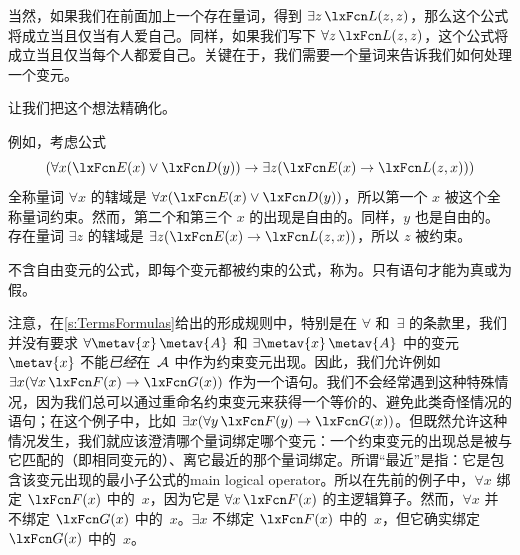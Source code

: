 当然，如果我们在前面加上一个存在量词，得到 $\exists z\,\atom{L}{z,z}$，那么这个公式将成立当且仅当有人爱自己。同样，如果我们写下 $\forall z\, \atom{L}{z,z}$，这个公式将成立当且仅当每个人都爱自己。关键在于，我们需要一个量词来告诉我们如何处理一个变元。

让我们把这个想法精确化。



例如，考虑公式
	$$(\forall x(\atom{E}{x} \eor \atom{D}{y}) \eif \exists z(\atom{E}{x} \eif \atom{L}{z,x}))$$
全称量词 $\forall x$ 的辖域是 $\forall x (\atom{E}{x} \eor \atom{D}{y})$，所以第一个 $x$ 被这个全称量词约束。然而，第二个和第三个 $x$ 的出现是自由的。同样，$y$ 也是自由的。存在量词 $\exists z$ 的辖域是 $\exists z(\atom{E}{x} \eif \atom{L}{z,x})$，所以 $z$ 被约束。

不含自由变元的公式，即每个变元都被约束的公式，称为。只有语句才能为真或为假。


注意，在\cref{s:TermsFormulas}给出的形成规则中，特别是在 $\forall$ 和~$\exists$ 的条款里，我们并没有要求 $\forall\metav{x}\,
\metav{A}$ 和 $\exists\metav{x}\,\metav{A}$ 中的变元~$\metav{x}$ 不能\emph{已经}在~$\mathcal{A}$ 中作为约束变元出现。因此，我们允许例如 $\exists x(\forall x\,\atom{F}{x} \eif \atom{G}{x})$ 作为一个语句。我们不会经常遇到这种特殊情况，因为我们总可以通过重命名约束变元来获得一个等价的、避免此类奇怪情况的语句；在这个例子中，比如 $\exists x(\forall y\,\atom{F}{y} \eif
\atom{G}{x})$。但既然允许这种情况发生，我们就应该澄清哪个量词绑定哪个变元：一个约束变元的出现总是被与它匹配的（即相同变元的）、离它最近的那个量词绑定。所谓“最近”是指：它是包含该变元出现的最小子公式的\gls{main logical operator}。所以在先前的例子中，$\forall x$ 绑定 $\atom{F}{x}$ 中的~$x$，因为它是 $\forall x\,\atom{F}{x}$ 的主逻辑算子。然而，$\forall x$ 并不绑定 $\atom{G}{x}$ 中的~$x$。$\exists x$ 不绑定 $\atom{F}{x}$ 中的~$x$，但它确实绑定 $\atom{G}{x}$ 中的~$x$。

